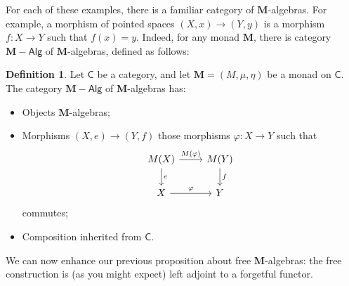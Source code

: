 \documentclass{article}
\theoremstyle{definition}
\newtheorem{defn}{Definition}
\newcommand{\C}{\mathsf{C}}
\newcommand{\Alg}{\mathsf{Alg}}
\begin{document}
For each of these examples, there is a familiar category of $\mathbf{M}$-algebras. For example, a morphism of pointed spaces $(X,x) \to (Y,y)$ is a morphism $f : X \to Y$ such that $f(x) = y$. Indeed, for any monad $\mathbf{M}$, there is category $\mathbf{M}{-}\Alg$ of $\mathbf{M}$-algebras, defined as follows:

\begin{defn}
    Let $\C$ be a category, and let $\mathbf{M} = (M,\mu,\eta)$ be a monad on $\C$. The category $\mathbf{M}{-}\Alg$ of $\mathbf{M}$-algebras has:
    \begin{itemize}
        \item Objects $\mathbf{M}$-algebras;
        \item Morphisms $(X,e) \to (Y,f)$ those morphisms $\varphi : X \to Y$ such that
        \[\begin{tikzcd}
        M(X) \rar["M(\varphi)"] \dar["e"] & M(Y) \dar["f"] \\
        X \rar["\varphi"] & Y
        \end{tikzcd}\]
        commutes;
        \item Composition inherited from $\C$.
    \end{itemize}
\end{defn}

We can now enhance our previous proposition about free $\mathbf{M}$-algebras: the free construction is (as you might expect) left adjoint to a forgetful functor.
\end{document}
